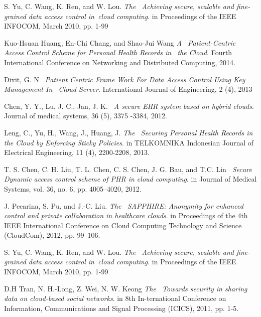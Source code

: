 
\newpage
\begin{thebibliography}{15}
S. Yu, C. Wang, K. Ren, and W. Lou. 
\textit{The \ Achieving secure, scalable and fine-grained data access control in\ cloud computing}. 
in Proceedings of the IEEE INFOCOM, March 2010, pp. 1-99
 
Kuo-Hsuan Huang, En-Chi Chang, and Shao-Jui Wang 
\textit{A \ Patient-Centric Access Control Scheme for Personal Health Records in \ the Cloud}.  Fourth International Conference on Networking and Distributed Computing, 2014. 

Dixit, G. N
\textit{\ Patient Centric Frame Work For Data Access Control Using Key Management In \ Cloud Server}.  International Journal of Engineering, 2 (4), 2013
 
Chen, Y. Y., Lu, J. C., Jan, J. K.
\textit{\ A secure EHR system based on hybrid clouds}.  Journal of medical systems, 36 (5), 3375 -3384, 2012.

Leng, C., Yu, H., Wang, J., Huang, J. 
\textit{The \ Securing Personal Health Records in the
Cloud by Enforcing Sticky Policies}. 
in TELKOMNIKA Indonesian Journal of Electrical Engineering, 11 (4), 2200-2208, 2013.

T. S. Chen, C. H. Liu, T. L. Chen, C. S. Chen, J. G. Bau, and T.C. Lin \textit{\ Secure Dynamic access control scheme of PHR in cloud computing}.  in Journal of Medical Systems, vol. 36, no. 6, pp. 4005–4020, 2012.

J. Pecarina, S. Pu, and J.-C. Liu. 
\textit{The \ SAPPHIRE: Anonymity for enhanced control and
private collaboration in healthcare clouds}. 
in Proceedings of the 4th IEEE International Conference on Cloud Computing Technology and Science
(CloudCom), 2012, pp. 99–106.

S. Yu, C. Wang, K. Ren, and W. Lou. 
\textit{The \ Achieving secure, scalable and fine-grained data access control in\ cloud computing}. 
in Proceedings of the IEEE INFOCOM, March 2010, pp. 1-99

D.H Tran, N. H.-Long, Z. Wei, N. W. Keong 
\textit{The \ Towards security in sharing data on cloud-based social networks}.  in 8th In-ternational Conference on Information, Communications and Signal Processing (ICICS), 2011, pp. 1-5.


\end{thebibliography}
